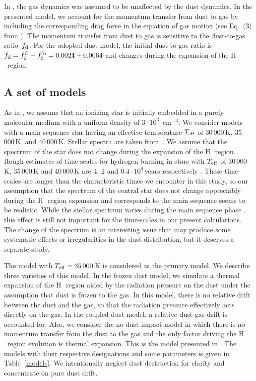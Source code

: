 \documentclass[a4paper,fleqn,usenatbib]{mnras}
\newcommand{\hii}    {H\,{\sc{ii}}~}
\begin{document}
In , the gas dynamics was assumed to be unaffected by the dust dynamics. In the presented model, we account for the momentum transfer from dust to gas by including the corresponding drag force in the equation of gas motion (see Eq.~(3) from ). The momentum transfer from dust to gas is sensitive to the dust-to-gas ratio~$f_{\rm d}$. For the adopted dust model, the initial dust-to-gas ratio is $f_{\rm d}=f_{\rm d}^{\rm C}+f_{\rm d}^{\rm Si}=0.0024+0.0064$ and changes during the expansion of the \hii region.

\subsection{A set of models}

As in , we assume that an ionizing star is initially embedded in a purely molecular medium with a uniform density of $3\cdot10^3$~cm$^{-3}$. We consider models with a main sequence star having an effective temperature $T_{\rm eff}$ of 30\,000\,K, 35\,000\,K, and 40\,000\,K. Stellar spectra are taken from~\citet{kurucz_79}. We assume that the spectrum of the star does not change during the expansion of the \hii region. Rough estimates of time-scales for hydrogen burning in stars with $T_{\rm eff}$ of 30\,000\,K, 35\,000\,K and 40\,000\,K are 4, 2 and $0.4 \cdot 10^6$\,years respectively \citep[see][Eq. 30.2 and Fig. 30.6]{Kippenhahn}. These time-scales are longer than the characteristic times we encounter in this study, so our assumption that the spectrum of the central star does not change appreciably during the \hii region expansion and corresponds to the main sequence seems to be realistic. While the stellar spectrum varies during the main sequence phase \citep[see e.g. recent results of][]{MartinsPalacios2017}, this effect is still not important for the time-scales in our present calculations. The change of the spectrum is an interesting issue that may produce some systematic effects or irregularities in the dust distribution, but it deserves a separate study.

The model with $T_{\rm eff}=35\,000$\,K is considered as the primary model. We describe three varieties of this model. In the frozen dust model, we simulate a thermal expansion of the \hii region aided by the radiation pressure on the dust under the assumption that dust is frozen to the gas. In this model, there is no relative drift between the dust and the gas, so that the radiation pressure effectively acts directly on the gas. In the coupled dust model, a relative dust-gas drift is accounted for. Also, we consider the no-dust-impact model in which there is no momentum transfer from the dust to the gas and the only factor driving the \hii region evolution is thermal expansion. This is the model presented in . The models with their respective designations and some parameters is given in Table~\ref{models}. We intentionally neglect dust destruction for clarity and concentrate on pure dust drift.
\end{document}
